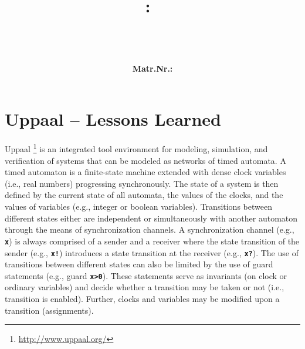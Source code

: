 \documentclass{article}
\title{
\vspace{2in}
\textmd{\textbf{\hmwkClass:\ \\ \hmwkTitle}}\\
\vspace{3in}
}
\author{
	\textbf{\hmwkAuthorName} \\
	\textbf{Matr.Nr.: \hmwkMatrNr}
}
\date{} %
\newcommand{\code}[1]{\texttt{\textbf{#1}}}
\begin{document}
\maketitle




\newpage

\section{Uppaal -- Lessons Learned}

Uppaal \footnote{\url{http://www.uppaal.org/}} is an integrated tool environment for modeling, simulation, and verification of systems that can be modeled as networks of timed automata. A timed automaton is a finite-state machine
extended with dense clock variables (i.e., real numbers) progressing synchronously. The state of a system is then defined by the current state of all automata, the values of the clocks, and the values of variables (e.g., integer or boolean variables). Transitions between different states either are independent or simultaneously with another automaton through the means of synchronization channels. A synchronization channel (e.g., \code{x}) is always comprised of a sender and a receiver where the state transition of the sender (e.g., \code{x!}) introduces a state transition at the receiver (e.g., \code{x?}). The use of transitions between different states can also be limited by the use of guard statements (e.g., guard \code{x>0}). These statements serve as invariants (on clock or ordinary variables) and decide whether a transition may be taken or not (i.e., transition is enabled). Further, clocks and variables may be modified upon a transition (assignments). 
\end{document}

